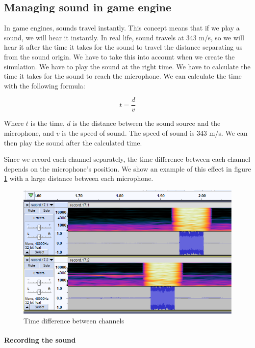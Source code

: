 \subsection{Managing sound in game engine}

In game engines, sounds travel instantly. This concept means that if we play a sound, we will hear it instantly. In real life, sound travels at 343 m/s, so we will hear it after the time it takes for the sound to travel the distance separating us from the sound origin. We have to take this into account when we create the simulation. We have to play the sound at the right time. We have to calculate the time it takes for the sound to reach the microphone. We can calculate the time with the following formula:

\begin{equation}
    t = \frac{d}{v}
\end{equation}
  
Where $t$ is the time, $d$ is the distance between the sound source and the microphone, and $v$ is the speed of sound. The speed of sound is 343 m/s. We can then play the sound after the calculated time.

Since we record each channel separately, the time difference between each channel depends on the microphone's position. We show an example of this effect in figure \ref{fig:time_delta_simulation_example} with a large distance between each microphone.

\begin{figure}[H]
    \centering
    \includegraphics[width=.8\textwidth]{images/time_delta_simulation_example.png}
    \caption{Time difference between channels}
    \label{fig:time_delta_simulation_example}
\end{figure}

\paragraph{Recording the sound}

